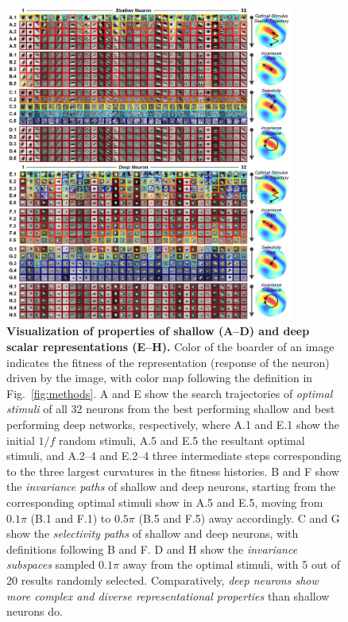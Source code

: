 \documentclass[10pt,twocolumn,letterpaper]{article}
\begin{document}
\begin{figure}
\begin{center}
\includegraphics[width=0.845\textwidth]{Figs/pic1.jpg} 
\end{center}
\caption{{\bf Visualization of properties of shallow (A--D) and deep scalar representations (E--H).}
Color of the boarder of an image indicates the fitness of the representation (\ie response of the neuron) driven by the image, with color map following the definition in Fig.~\ref{fig:methods}.
A and E show the search trajectories of \emph{optimal stimuli} of all 32 neurons from the best performing shallow and best performing deep networks, respectively, where A.1 and E.1 show the initial $1/f$ random stimuli, A.5 and E.5 the resultant optimal stimuli, and A.2--4 and E.2--4 three intermediate steps corresponding to the three largest curvatures in the fitness histories.
B and F show the \emph{invariance paths} of shallow and deep neurons, starting from the corresponding optimal stimuli show in A.5 and E.5, moving from $0.1\pi$ (B.1 and F.1) to $0.5\pi$ (B.5 and F.5) away accordingly.
C and G show the \emph{selectivity paths} of shallow and deep neurons, with definitions following B and F.
D and H show the \emph{invariance subspaces} sampled $0.1\pi$ away from the optimal stimuli, with 5 out of 20 results randomly selected.
Comparatively, \emph{deep neurons show more complex and diverse representational properties} than shallow neurons do.
} %
\label{fig:allrep}
\end{figure}
\end{document}
